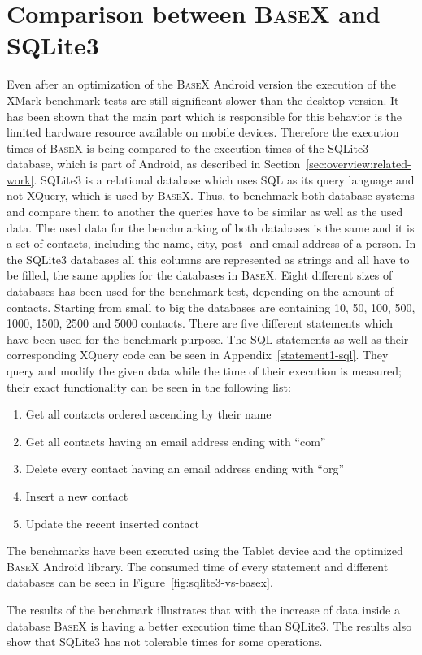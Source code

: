 \section{Comparison between \textsc{BaseX} and SQLite3}
\label{sec:comparison-between-basex-and-sqlite}
Even after an optimization of the \textsc{BaseX} Android version the execution of the XMark benchmark tests are still significant slower than the desktop version.
It has been shown that the main part which is responsible for this behavior is the limited hardware resource available on mobile devices.
Therefore the execution times of \textsc{BaseX} is being compared to the execution times of the SQLite3 database, which is part of Android, as described in Section~\ref{sec:overview:related-work}.
SQLite3 is a relational database which uses SQL as its query language and not XQuery, which is used by \textsc{BaseX}.
Thus, to benchmark both database systems and compare them to another the queries have to be similar as well as the used data.
The used data for the benchmarking of both databases is the same and it is a set of contacts, including the name, city, post- and email address of a person.
In the SQLite3 databases all this columns are represented as strings and all have to be filled, the same applies for the databases in \textsc{BaseX}.
Eight different sizes of databases has been used for the benchmark test, depending on the amount of contacts.
Starting from small to big the databases are containing 10, 50, 100, 500, 1000, 1500, 2500 and 5000 contacts.
There are five different statements which have been used for the benchmark purpose.
The SQL statements as well as their corresponding XQuery code can be seen in Appendix~\ref{statement1-sql}.
They query and modify the given data while the time of their execution is measured; their exact functionality can be seen in the following list:
\begin{enumerate}
	\item Get all contacts ordered ascending by their name
	\item Get all contacts having an email address ending with ``com''
	\item Delete every contact having an email address ending with ``org''
	\item Insert a new contact
	\item Update the recent inserted contact
\end{enumerate}
The benchmarks have been executed using the Tablet device and the optimized \textsc{BaseX} Android library.
The consumed time of every statement and different databases can be seen in Figure~\ref{fig:sqlite3-vs-basex}.



The results of the benchmark illustrates that with the increase of data inside a database \textsc{BaseX} is having a better execution time than SQLite3.
The results also show that SQLite3 has not tolerable times for some operations.





